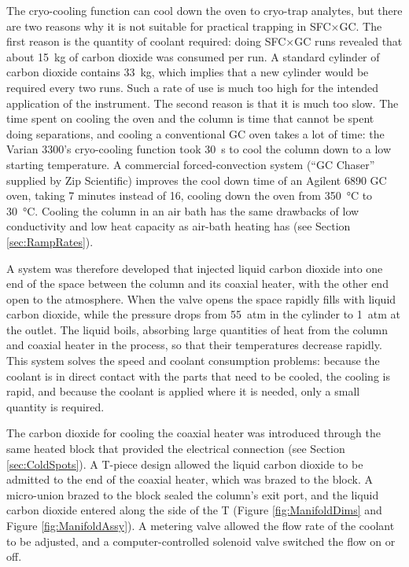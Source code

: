 The cryo-cooling function can cool down the oven to cryo-trap analytes, but
there are two reasons why it is not suitable for practical trapping in SFC×GC.
The first reason is the quantity of coolant required: doing SFC×GC runs revealed
that about \SI{15}{\kilogram} of carbon dioxide was consumed per run. A standard
cylinder of carbon dioxide contains \SI{33}{\kilogram}, which implies that a new
cylinder would be required every two runs. Such a rate of use is much too high
for the intended application of the instrument. The second reason is that it is
much too slow. The time spent on cooling the oven and the column is time that
cannot be spent doing separations, and cooling a conventional GC oven takes a
lot of time: the Varian 3300's cryo-cooling function took \SI{30}{\second} to
cool the column down to a low starting temperature. A commercial
forced-convection system (``GC Chaser'' supplied by Zip Scientific) improves the
cool down time of an Agilent 6890 GC oven, taking 7 minutes instead of 16,
cooling down the oven from \SI{350}{\celsius} to \SI{30}{\celsius}.
Cooling the column in an air bath has the same drawbacks of low conductivity and
low heat capacity as air-bath heating has (see Section \ref{sec:RampRates}).

A system was therefore developed that injected liquid carbon dioxide into one
end of the space between the column and its coaxial heater, with the other end
open to the atmosphere. When the valve opens the space rapidly fills with liquid
carbon dioxide, while the pressure drops from \SI{55}{atm} in the cylinder to
\SI{1}{atm} at the outlet. The liquid boils, absorbing large quantities of heat
from the column and coaxial heater in the process, so that their temperatures
decrease rapidly. This system solves the speed and coolant consumption problems:
because the coolant is in direct contact with the parts that need to be cooled,
the cooling is rapid, and because the coolant is applied where it is needed,
only a small quantity is required.

The carbon dioxide for cooling the coaxial heater was introduced through the
same heated block that provided the electrical connection (see Section
\ref{sec:ColdSpots}). A T-piece design allowed the liquid carbon dioxide to be
admitted to the end of the coaxial heater, which was brazed to the block. A
micro-union brazed to the block sealed the column's exit port, and the liquid
carbon dioxide entered along the side of the T (Figure \ref{fig:ManifoldDims}
and Figure \ref{fig:ManifoldAssy}). A metering valve allowed the flow rate of
the coolant to be adjusted, and a computer-controlled solenoid valve switched
the flow on or off.

